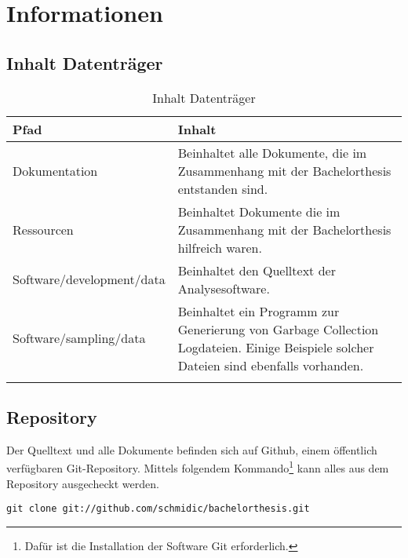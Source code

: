 \chapter{Informationen}

\section{Inhalt Datenträger}
  \begin{longtable}{|p{5cm}|p{8cm}|}
\hline
  \textbf{Pfad} & \textbf{Inhalt}\\\hline
    Dokumentation & Beinhaltet alle Dokumente, die im Zusammenhang mit der Bachelorthesis entstanden sind.\\\hline
    Ressourcen & Beinhaltet Dokumente die im Zusammenhang mit der Bachelorthesis hilfreich waren.\\\hline
    Software/development/data & Beinhaltet den Quelltext der Analysesoftware.\\\hline
    Software/sampling/data & Beinhaltet ein Programm zur Generierung von Garbage Collection Logdateien. Einige Beispiele solcher Dateien sind ebenfalls vorhanden.\\\hline
      \caption{Inhalt Datenträger}\\
  \end{longtable}

\section{Repository}
Der Quelltext und alle Dokumente befinden sich auf Github, einem öffentlich verfügbaren Git-Repository. Mittels folgendem Kommando\footnote{Dafür ist die Installation der Software Git erforderlich.} kann alles aus dem Repository ausgecheckt werden.

\begin{lstlisting}[caption=Checkout Quelltext Repository]
git clone git://github.com/schmidic/bachelorthesis.git
\end{lstlisting}



